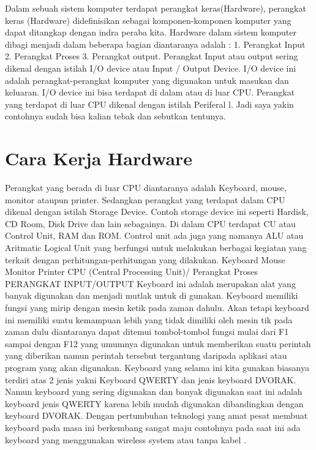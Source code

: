 Dalam sebuah sistem komputer terdapat perangkat keras(Hardware), perangkat keras (Hardware) didefinisikan sebagai komponen-komponen komputer yang dapat ditangkap dengan indra peraba kita. Hardware dalam sistem komputer dibagi menjadi dalam beberapa bagian diantaranya adalah : 1. Perangkat Input 2. Perangkat Proses 3. Perangkat output. Perangkat Input atau output sering dikenal dengan istilah I/O device atau Input / Output Device. I/O device ini adalah perangkat-perangkat komputer yang digunakan untuk masukan dan keluaran. I/O device ini bisa terdapat di dalam atau di luar CPU. Perangkat yang terdapat di luar CPU dikenal dengan istilah Periferal l. Jadi saya yakin contohnya sudah bisa kalian tebak dan sebutkan tentunya.
\section{Cara Kerja Hardware}
Perangkat yang berada di luar CPU diantaranya adalah Keyboard, mouse, monitor ataupun printer. Sedangkan perangkat yang terdapat dalam CPU dikenal dengan istilah Storage Device. Contoh storage device ini seperti Hardisk, CD Room, Disk Drive dan lain sebagainya. Di dalam CPU terdapat CU atau Control Unit, RAM dan ROM. Control unit ada juga yang namanya ALU atau Aritmatic Logical Unit yang berfungsi untuk melakukan berbagai kegiatan yang terkait dengan perhitungan-perhitungan yang dilakukan.
Keyboard Mouse Monitor Printer CPU (Central Processing Unit)/ Perangkat Proses PERANGKAT INPUT/OUTPUT Keyboard ini adalah merupakan alat yang banyak digunakan dan menjadi mutlak untuk di gunakan. Keyboard memiliki fungsi yang mirip dengan mesin ketik pada zaman dahulu. Akan tetapi keyboard ini memiliki  suatu kemampuan lebih yang tidak dimiliki oleh mesin tik pada zaman dulu diantaranya dapat ditemui tombol-tombol fungsi mulai dari F1 sampai dengan F12 yang umumnya digunakan untuk memberikan suatu perintah yang diberikan namun perintah tersebut tergantung daripada aplikasi atau program yang akan digunakan. Keyboard yang selama ini kita gunakan biasanya terdiri atas 2 jenis yakni Keyboard QWERTY dan jenis keyboard DVORAK. Namun keyboard yang sering digunakan dan banyak digunakan saat ini adalah keyboard jenis QWERTY karena lebih mudah digunakan dibandingkan dengan keyboard DVORAK. Dengan pertumbuhan teknologi yang amat pesat membuat keyboard pada masa ini berkembang sangat maju contohnya pada saat ini ada keyboard yang menggunakan wireless system atau tanpa kabel . 
